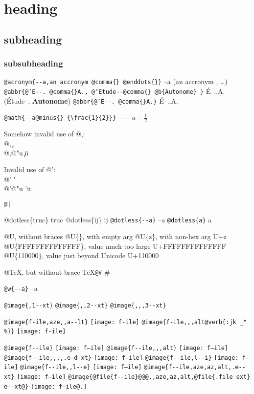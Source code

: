 \documentclass{book}
\newcommand{\GNUTexinfoplaceholder}[1]{}
\newcommand{\GNUTexinfonopagebreakheading}[2]{\let\clearpage\relax \let\cleardoublepage\relax \let\thispagestyle\GNUTexinfoplaceholder #1{#2}}
\renewcommand{\includegraphics}[1]{\fbox{FIG \detokenize{#1}}}
\begin{document}
\GNUTexinfonopagebreakheading{\section*}{{heading}}

\GNUTexinfonopagebreakheading{\subsection*}{{subheading}}

\GNUTexinfonopagebreakheading{\subsubsection*}{{subsubheading}}


\texttt{@acronym\{{-}{-}a,an accronym @comma\{\} @enddots\{\}\}} --a (an accronym , \dots{})
\texttt{@abbr\{@'E{-}{-}. @comma\{\}A., @'Etude{-}{-}@comma\{\} @b\{Autonome\} \}} \'{E}--.\@ ,A.\@ (\'{E}tude--, \textbf{Autonome})
\texttt{@abbr\{@'E{-}{-}. @comma\{\}A.\}} \'{E}--.\@ ,A.\@

\texttt{@math\{{-}{-}a@minus\{\} \{\textbackslash{}frac\{1\}\{2\}\}\}} $--a- {\frac{1}{2}}$




Somehow invalid use of @,:\leavevmode{}\\
@, \c{}
\leavevmode{}\\
@,@"u \c{}\"{u}

Invalid use of @':\leavevmode{}\\
@' \'{}
\leavevmode{}\\
@'@"u \'{}\"{u}

\texttt{@|} 

@dotless\{truc\} truc
@dotless\{ij\} ij
\texttt{@dotless\{{-}{-}a\}} --a
\texttt{@dotless\{a\}} a

@U, without braces @U\{\}, with empty arg 
@U\{z\}, with non-hex arg U+z
@U\{FFFFFFFFFFFFFF\}, value much too large U+FFFFFFFFFFFFFF
@U\{110000\}, value just beyond Unicode U+110000

@TeX, but without brace \TeX{}\texttt{@\#} \#

\texttt{@w\{{-}{-}a\}} \hbox{--a}

\texttt{@image\{,1{-}{-}xt\}} 
\texttt{@image\{,,2{-}{-}xt\}} 
\texttt{@image\{,,,3{-}{-}xt\}} 

\texttt{@image\{f-ile,aze,,a{-}{-}lt\}} \texttt{[image: f-ile]}
\texttt{@image\{f-ile,,,alt@verb\{:jk \_" \%\@\}\}} \texttt{[image: f-ile]}

\texttt{@image\{f{-}{-}ile\}} \texttt{[image: f--ile]}
\texttt{@image\{f{-}{-}ile,,,alt\}} \texttt{[image: f--ile]}
\texttt{@image\{f{-}{-}ile,,,,.e-d-xt\}} \texttt{[image: f--ile]}
\texttt{@image\{f{-}{-}ile,l{-}{-}i\}} \texttt{[image: f--ile]}
\texttt{@image\{f{-}{-}ile,,l{-}{-}e\}} \texttt{[image: f--ile]}
\texttt{@image\{f{-}{-}ile,aze,az,alt,.e{-}{-}xt\}} \texttt{[image: f--ile]}
\texttt{@image\{@file\{f{-}{-}ile\}@@@.,aze,az,alt,@file\{.file ext\} e{-}{-}xt@\}} \texttt{[image: f--ile@.]}
\end{document}
